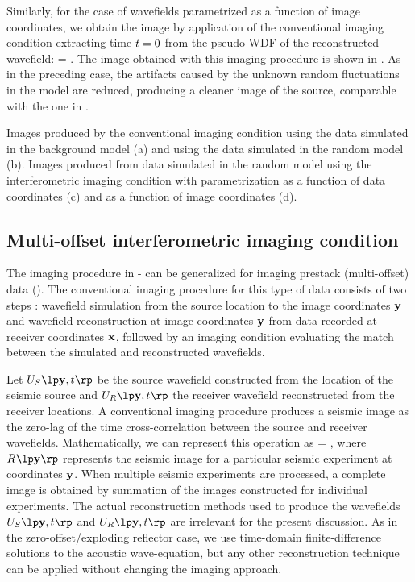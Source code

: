 Similarly, for the case of wavefields parametrized as a function of
image coordinates, we obtain the image by application of the
conventional imaging condition extracting time ${t}=0$ from the pseudo
WDF of the reconstructed wavefield:
%
\beq \label{eqn:iyy}
 =  \;.
\eeq
%
The image obtained with this imaging procedure is shown in
. As in the preceding case, the artifacts caused
by the unknown random fluctuations in the model are reduced, producing
a cleaner image of the source, comparable with the one in
.


{ Images produced by the conventional imaging condition using the data
simulated in the background model (a) and using the data simulated in
the random model (b). Images produced from data simulated in the
random model using the interferometric imaging condition with
parametrization as a function of data coordinates (c) and as a
function of image coordinates (d).}

\subsection{Multi-offset interferometric imaging condition}

The imaging procedure in - can be generalized for
imaging prestack (multi-offset) data (). The conventional
imaging procedure for this type of data consists of two steps
\cite[]{Claerbout.iei}: wavefield simulation from the source location
to the image coordinates ${\mathbf{y}}$ and wavefield reconstruction at image
coordinates ${\mathbf{y}}$ from data recorded at receiver coordinates ${\mathbf{x}}$,
followed by an imaging condition evaluating the match between the
simulated and reconstructed wavefields.

Let $\UA{S}{\ym,\tm}$ be the source wavefield constructed from the
location of the seismic source and $\UA{R}{\ym,\tm}$ the receiver
wavefield reconstructed from the receiver locations. A conventional
imaging procedure produces a seismic image as the zero-lag of the time
cross-correlation between the source and receiver
wavefields. Mathematically, we can represent this operation as
%
\beq
\IA{}{\ym} = \inttm {}  \;,
\eeq
%
where $\IA{}{\ym}$ represents the seismic image for a particular
seismic experiment at coordinates ${\mathbf{y}}$. When multiple seismic
experiments are processed, a complete image is obtained by summation
of the images constructed for individual experiments. The actual
reconstruction methods used to produce the wavefields
$\UA{S}{\ym,\tm}$ and $\UA{R}{\ym,\tm}$ are irrelevant for the present
discussion. As in the zero-offset/exploding reflector case, we use
time-domain finite-difference solutions to the acoustic wave-equation,
but any other reconstruction technique can be applied without changing
the imaging approach.

